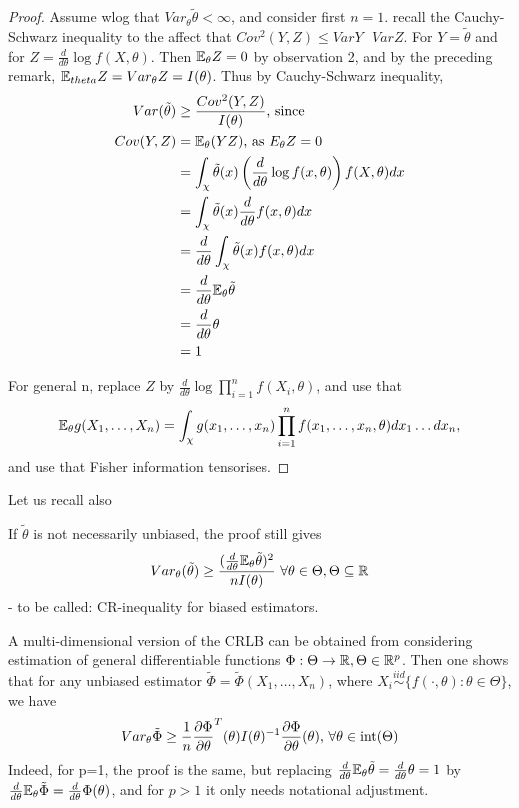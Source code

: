 \documentclass[a4paper]{article}
\begin{document}
\begin{proof}
	Assume wlog  that $Var_{\theta} \tilde{\theta} < \infty$, and consider first $n=1$. recall the Cauchy-Schwarz inequality to the affect that $Cov^2(Y, Z) \le Var Y\text{ } Var Z$. For $Y= \tilde{\theta}$ and for $Z = \frac{d}{d\theta} \log f(X, \theta)$. Then $\mathbb{E}_{\theta} Z = 0$ by observation 2, and by the preceding remark, $\mathbb{E}_{theta} Z = Var_{\theta} Z = I(\theta)$. Thus by Cauchy-Schwarz inequality,
	\begin{align*}
		Var(\tilde{\theta}) &\ge \frac{Cov^2(Y, Z)}{I(\theta)} \text{, since} \\
		Cov(Y,Z) &= \mathbb{E}_{\theta}(YZ) \text{, as } E_{\theta} Z = 0 \\
		&= \int_{\chi} \tilde{\theta} (x) \left( \frac{d}{d\theta} \log f(x,\theta) \right) f(X, \theta) dx \\
		&= \int_{\chi} \tilde{\theta}(x) \frac{d}{d\theta} f(x,\theta) dx \\
		&= \frac{d}{d\theta} \int_{\chi} \tilde{\theta}(x) f(x, \theta) dx \\
		&= \frac{d}{d\theta} \mathbb{E}_{\theta} \tilde{\theta} \\
		&= \frac{d}{d \theta} \theta \\
		&= 1
	\end{align*}

	For general n, replace $Z$ by $\frac{d}{d\theta} \log \prod_{i=1}^{n} f(X_{i}, \theta)$, and use that 
\[
	\mathbb{E}_{\theta} g(X_1, \ldots, X_n) = \int_{\chi} g(x_1, \ldots, x_n) \prod_{i=1}^{n} f(x_1, \ldots, x_n, \theta ) dx_{1} \ldots dx_{n}
,\]
and use that Fisher information tensorises. 
\end{proof}

Let us recall also

\begin{corol}
	If $\tilde{\theta}$ is not necessarily unbiased, the proof still gives
	\[
		Var_{\theta} (\tilde{\theta}) \ge \frac{(\frac{d}{d\theta} \mathbb{E}_{\theta} \tilde{\theta} )^2} {nI(\theta)} \text{ } \forall \theta \in \Theta, \Theta \subseteq \mathbb{R}
	\] - to be called: CR-inequality for biased estimators. 
\end{corol}

A multi-dimensional version of the CRLB can be obtained from considering estimation of general differentiable functions $\Phi : \Theta \to \mathbb{R}, \Theta \in \mathbb{R}^{p}$. Then one shows that for any unbiased estimator $\tilde{\Phi} = \tilde{\Phi}(X_1, \ldots, X_n)$, where $X_i \stackrel{iid}{\sim} \{f(\cdot , \theta) : \theta \in \Theta\} $, we have
\[
	Var_{\theta} \tilde{\Phi} \ge \frac{1}{n} \frac{\partial\Phi}{\partial\theta}^{T}(\theta)I(\theta)^{-1}\frac{\partial\Phi}{\partial\theta}(\theta) \text{,  } \forall \theta \in\operatorname{int}(\Theta)
\] 
Indeed, for p=1, the proof is the same, but replacing $\frac{d}{d\theta} \mathbb{E}_{\theta} \tilde{\theta} = \frac{d}{d\theta} \theta = 1$ by $\frac{d}{d\theta} \mathbb{E}_{\theta} \tilde{\Phi} = \frac{d}{d\theta} \Phi(\theta)$, and for $p>1$ it only needs notational adjustment.
\end{document}
